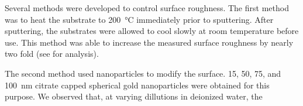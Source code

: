 Several methods were developed to control surface roughness.  The first
method was to heat the substrate to \SI{200}{\celsius} immediately prior to
sputtering.  After sputtering, the substrates were allowed to cool slowly
at room temperature before use.  This method was able to increase the
measured surface roughness by nearly two fold (see
 for analysis).

The second method used nanoparticles to modify the surface.  15, 50, 75,
and \SI{100}{\nano\meter} citrate capped spherical gold nanoparticles were
obtained for this purpose.  We observed that, at varying dillutions in
deionized water, the 
